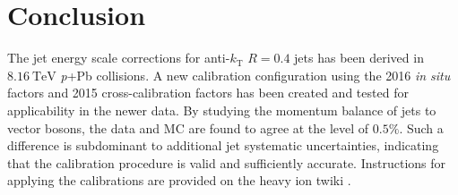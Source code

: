\documentclass[NOTE, atlasdraft=true, texlive=2016, USenglish]{\ATLASLATEXPATH atlasdoc}
\begin{document}

\section{Conclusion}
\label{sec:conclusion}

The jet energy scale corrections for anti-$k_{\text{T}}$ $R=0.4$ jets has been derived in $\SI{8.16}{\TeV}$ \textit{p}+Pb collisions.   A new calibration configuration using the 2016 \textit{in situ} factors and 2015 cross-calibration factors has been created and tested for applicability in the newer data. By studying the momentum balance of jets to vector bosons, the data and MC are found to agree at the level of $0.5\%$. Such a difference is subdominant to additional jet systematic uncertainties, indicating that the calibration procedure is valid and sufficiently accurate. Instructions for applying the calibrations are provided on the heavy ion twiki \cite{HIRun2JESdata2016}.

\clearpage
\printbibliography
% 
% 

\end{document}
